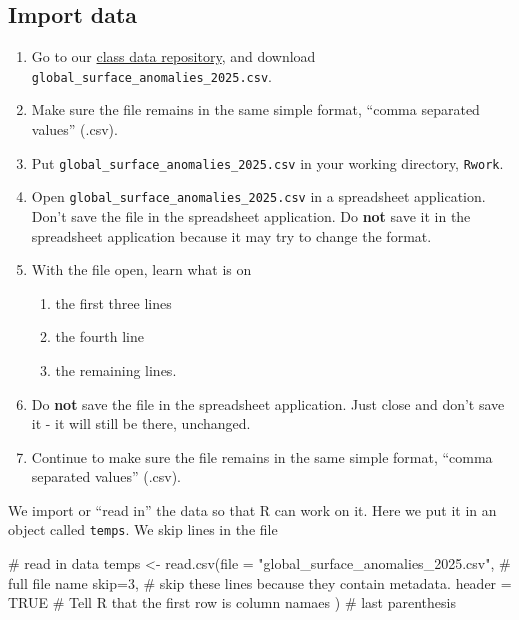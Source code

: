\documentclass[
  letterpaper,
  DIV=11,
  numbers=noendperiod]{scrreprt}
\newenvironment{Shaded}{\begin{snugshade}}{\end{snugshade}}
\newcommand{\AttributeTok}[1]{\textcolor[rgb]{0.40,0.45,0.13}{#1}}
\newcommand{\CommentTok}[1]{\textcolor[rgb]{0.37,0.37,0.37}{#1}}
\newcommand{\ConstantTok}[1]{\textcolor[rgb]{0.56,0.35,0.01}{#1}}
\newcommand{\DecValTok}[1]{\textcolor[rgb]{0.68,0.00,0.00}{#1}}
\newcommand{\FunctionTok}[1]{\textcolor[rgb]{0.28,0.35,0.67}{#1}}
\newcommand{\NormalTok}[1]{\textcolor[rgb]{0.00,0.23,0.31}{#1}}
\newcommand{\OtherTok}[1]{\textcolor[rgb]{0.00,0.23,0.31}{#1}}
\newcommand{\StringTok}[1]{\textcolor[rgb]{0.13,0.47,0.30}{#1}}
\providecommand{\tightlist}{%
  \setlength{\itemsep}{0pt}\setlength{\parskip}{0pt}}
\begin{document}
\subsection{Import data}\label{import-data}

\begin{enumerate}
\def\labelenumi{\arabic{enumi}.}
\tightlist
\item
  Go to our
  \href{https://drive.google.com/drive/u/1/folders/1FR2FLiW3xyD4Er52YzVTToPZuXXReGRo}{class
  data repository}, and download
  \texttt{global\_surface\_anomalies\_2025.csv}.
\item
  Make sure the file remains in the same simple format, ``comma
  separated values'' (.csv).
\item
  Put \texttt{global\_surface\_anomalies\_2025.csv} in your working
  directory, \texttt{Rwork}.
\item
  Open \texttt{global\_surface\_anomalies\_2025.csv} in a spreadsheet
  application. Don't save the file in the spreadsheet application. Do
  \textbf{not} save it in the spreadsheet application because it may try
  to change the format.
\item
  With the file open, learn what is on

  \begin{enumerate}
  \def\labelenumii{\alph{enumii}.}
  \tightlist
  \item
    the first three lines
  \item
    the fourth line
  \item
    the remaining lines.
  \end{enumerate}
\item
  Do \textbf{not} save the file in the spreadsheet application. Just
  close and don't save it - it will still be there, unchanged.
\item
  Continue to make sure the file remains in the same simple format,
  ``comma separated values'' (.csv).
\end{enumerate}

We import or ``read in'' the data so that R can work on it. Here we put
it in an object called \texttt{temps}. We skip lines in the file

\begin{Shaded}
\begin{Highlighting}[]
\CommentTok{\# read in data}
\NormalTok{temps }\OtherTok{\textless{}{-}} \FunctionTok{read.csv}\NormalTok{(}\AttributeTok{file =} \StringTok{"global\_surface\_anomalies\_2025.csv"}\NormalTok{, }\CommentTok{\# full file name}
                  \AttributeTok{skip=}\DecValTok{3}\NormalTok{, }\CommentTok{\# skip these lines because they contain metadata.}
                  \AttributeTok{header =} \ConstantTok{TRUE} \CommentTok{\# Tell R that the first row is column namaes}
\NormalTok{                  ) }\CommentTok{\# last parenthesis}
\end{Highlighting}
\end{Shaded}
\end{document}

